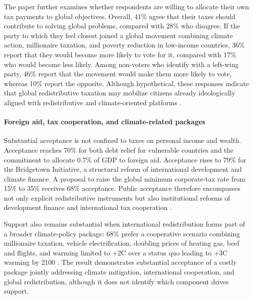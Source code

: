 The paper further examines whether respondents are willing to allocate their own tax payments to global objectives. Overall, 41\% agree that their taxes should contribute to solving global problems, compared with 28\% who disagree. %
If the party to which they feel closest joined a global movement combining climate action, millionaire taxation, and poverty reduction in low-income countries, 36\% report that they would become more likely to vote for it, compared with 17\% who would become less likely. Among non-voters who identify with a left-wing party, 46\% report that the movement would make them more likely to vote, whereas 10\% report the opposite. Although hypothetical, these responses indicate that global redistributive taxation may mobilize citizens already ideologically aligned with redistributive and climate-oriented platforms \citep{fabre_public_2026}.

\paragraph{Foreign aid, tax cooperation, and climate-related packages}
Substantial acceptance is not confined to taxes on personal income and wealth. Acceptance reaches 70\% for both debt relief for vulnerable countries and the %
commitment 
to allocate %
0.7\% of GDP %
to foreign aid. Acceptance rises to 79\% for the Bridgetown Initiative, %
a structural reform of international development and climate 
finance. A proposal to raise the global minimum corporate-tax rate from 15\% to 35\% receives 68\% acceptance. Public acceptance therefore encompasses not only explicit redistributive instruments but also institutional reforms of development finance and international tax cooperation \citep{fabre_public_2026}.

Support also remains substantial when international redistribution forms part of a broader climate-policy package: 68\% prefer a cooperative scenario combining millionaire taxation, vehicle electrification, doubling prices of heating gas, beef and flights, %
and warming limited to +2\textdegree{}C over a status quo leading to +3\textdegree{}C warming by 2100 \citep{fabre_public_2026}. The result demonstrates substantial acceptance of a costly package jointly addressing climate mitigation, international cooperation, and global redistribution, although it does not identify which component drives support.


